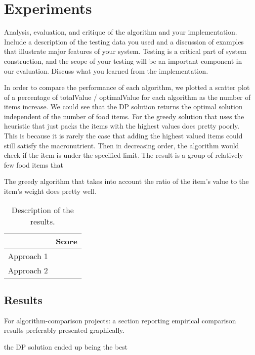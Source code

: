 \documentclass[11pt]{article}
\begin{document}
\section{Experiments}
Analysis, evaluation, and critique of the algorithm and your
implementation. Include a description of the testing data you used and
a discussion of examples that illustrate major features of your
system. Testing is a critical part of system construction, and the
scope of your testing will be an important component in our
evaluation. Discuss what you learned from the implementation. \par

\vspace{2mm}

\noindent In order to compare the performance of each algorithm, we plotted a scatter plot of a percentage of totalValue / optimalValue for each algorithm as the number of items increase. We could see that the DP solution returns the optimal solution independent of the number of food items. For the greedy solution that uses the heuristic that just packs the items with the highest values does pretty poorly. This is because it is rarely the case that adding the highest valued items could still satisfy the macronutrient. Then in decreasing order, the algorithm would check if the item is under the specified limit. The result is a group of relatively few food items that \par
\vspace{2mm}
\noindent The greedy algorithm that takes into account the ratio of the item's value to the item's weight does pretty well.

\begin{table}
  \centering
  \begin{tabular}{ll}
    \toprule
    & Score \\
    \midrule
    Approach 1 & \\
    Approach 2 & \\
    \bottomrule
  \end{tabular}
  \caption{Description of the results.}
\end{table}


\subsection{Results}

 For algorithm-comparison projects: a section reporting empirical comparison results preferably presented graphically.\par
 \vspace{2mm}
 \noindent the DP solution ended up being the best
\end{document}
